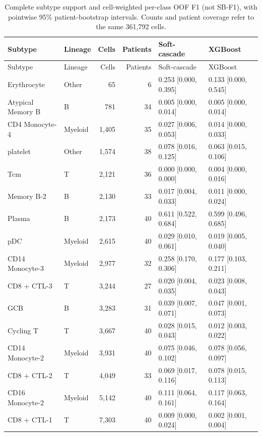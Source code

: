 \begingroup\small
\setlength{\tabcolsep}{4pt}
\renewcommand{\arraystretch}{1.10}
\begin{longtable}{llrrll}
\caption{Complete subtype support and cell-weighted per-class OOF F1 (not SB-F1), with pointwise 95\% patient-bootstrap intervals. Counts and patient coverage refer to the same 361,792 cells.}\label{tab:subtype_per_class} \\
\toprule
Subtype & Lineage & Cells & Patients & Soft-cascade & XGBoost \\
\midrule\endfirsthead
\toprule
Subtype & Lineage & Cells & Patients & Soft-cascade & XGBoost \\
\midrule\endhead
\bottomrule\endfoot
Erythrocyte & Other & 65 & 6 & 0.253 [0.000, 0.395] & 0.133 [0.000, 0.545] \\
Atypical Memory B & B & 781 & 34 & 0.005 [0.000, 0.014] & 0.005 [0.000, 0.014] \\
CD4 Monocyte-4 & Myeloid & 1,405 & 35 & 0.027 [0.006, 0.053] & 0.014 [0.000, 0.033] \\
platelet & Other & 1,574 & 38 & 0.078 [0.016, 0.125] & 0.063 [0.015, 0.106] \\
Tcm & T & 2,121 & 36 & 0.000 [0.000, 0.000] & 0.004 [0.000, 0.016] \\
Memory B-2 & B & 2,130 & 33 & 0.017 [0.004, 0.033] & 0.011 [0.000, 0.024] \\
Plasma & B & 2,173 & 40 & 0.611 [0.522, 0.684] & 0.599 [0.496, 0.685] \\
pDC & Myeloid & 2,615 & 40 & 0.029 [0.010, 0.061] & 0.019 [0.005, 0.040] \\
CD14 Monocyte-3 & Myeloid & 2,977 & 32 & 0.258 [0.170, 0.306] & 0.177 [0.103, 0.211] \\
CD8 + CTL-3 & T & 3,244 & 27 & 0.020 [0.004, 0.035] & 0.023 [0.008, 0.043] \\
GCB & B & 3,283 & 31 & 0.039 [0.007, 0.071] & 0.047 [0.001, 0.073] \\
Cycling T & T & 3,667 & 40 & 0.028 [0.015, 0.043] & 0.012 [0.003, 0.022] \\
CD14 Monocyte-2 & Myeloid & 3,931 & 40 & 0.075 [0.046, 0.102] & 0.078 [0.056, 0.097] \\
CD8 + CTL-2 & T & 4,049 & 33 & 0.069 [0.017, 0.116] & 0.078 [0.015, 0.113] \\
CD16 Monocyte-2 & Myeloid & 5,142 & 40 & 0.111 [0.064, 0.161] & 0.117 [0.063, 0.164] \\
CD8 + CTL-1 & T & 7,303 & 40 & 0.009 [0.000, 0.024] & 0.002 [0.001, 0.004] \\

\end{longtable}
